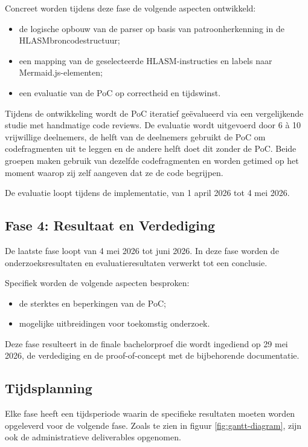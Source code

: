 Concreet worden tijdens deze fase de volgende aspecten ontwikkeld:

\begin{itemize}
    \item de logische opbouw van de parser op basis van patroonherkenning in de HLASM\-broncodestructuur;
    \item een mapping van de geselecteerde HLASM-instructies en labels naar Mermaid.js-elementen;
    \item een evaluatie van de PoC op correctheid en tijdswinst.
\end{itemize}

Tijdens de ontwikkeling wordt de PoC iteratief geëvalueerd via een vergelijkende studie met handmatige code reviews. De evaluatie wordt uitgevoerd door 6 à 10 vrijwillige deelnemers, de helft van de deelnemers gebruikt de PoC om codefragmenten uit te leggen en de andere helft doet dit zonder de PoC. Beide groepen maken gebruik van dezelfde codefragmenten en worden getimed op het moment waarop zij zelf aangeven dat ze de code begrijpen. 

De evaluatie loopt tijdens de implementatie, van 1 april 2026 tot 4 mei 2026. 

\subsection{Fase 4: Resultaat en Verdediging}

De laatste fase loopt van 4 mei 2026 tot juni 2026. In deze fase worden de onderzoeksresultaten en evaluatieresultaten verwerkt tot een conclusie.

Specifiek worden de volgende aspecten besproken:

\begin{itemize}
    \item de sterktes en beperkingen van de PoC;
    \item mogelijke uitbreidingen voor toekomstig onderzoek.
\end{itemize}

Deze fase resulteert in de finale bachelorproef die wordt ingediend op 29 mei 2026, de verdediging en de proof-of-concept met de bijbehorende documentatie.

\subsection{Tijdsplanning}

Elke fase heeft een tijdsperiode waarin de specifieke resultaten moeten worden opgeleverd voor de volgende fase. Zoals te zien in figuur \ref{fig:gantt-diagram}, zijn ook de administratieve deliverables opgenomen.

